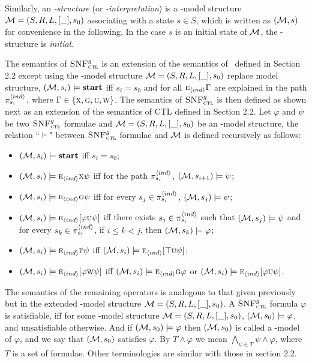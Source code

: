 \documentclass[letterpaper]{article} %
\begin{document}
Similarly, an {\em \Ind-structure} (or {\em \Ind-interpretation}) is a \Ind-model structure
${\cal M}=(S, R, L, [\_], s_0)$ associating
with a state $s\in S$, which is written as $({\cal M},s)$ for convenience in the following.
In the case $s$ is an initial state of $\cal M$, the \Ind-structure is {\em initial}.

The semantics of ${\textsc{SNF}_{\textsc{ctl}}^g}$ is an extension of the semantics of \CTL\ defined in Section 2.2 except using the \Ind-model structure ${\cal M}=(S,R,L,[\_],s_0)$ replace model structure, $({\cal M},s_i) \models \textbf{start}$ iff $s_i=s_0$ and for all $\textsc{e}_{{\langle{ind}\rangle}} \Gamma$ are explained in the path $\pi_{s_i}^{{\langle{ind}\rangle}}$, where $\Gamma\in \{\textsc{x}, \textsc{g}, \textsc{u},\textsc{w}\}$.
The semantics of ${\textsc{SNF}_{\textsc{ctl}}^g}$ is then
defined as shown next as an extension of the semantics of CTL defined in Section 2.2. Let $\varphi$ and $\psi$ be two ${\textsc{SNF}_{\textsc{ctl}}^g}$ formulae and ${\cal M}=(S,R,L,[\_],s_0)$ be an \Ind-model structure, the relation ``$\models$" between ${\textsc{SNF}_{\textsc{ctl}}^g}$ formulae and ${\cal M}$ is defined recursively as follows:
\begin{itemize}
  \item $({\cal M},s_i) \models \textbf{start}$ iff $s_i=s_0$;
  \item $({\cal M},s_i)\models \textsc{e}_{{\langle{ind}\rangle}} \textsc{x} \psi$ iff for the path $\pi_{s_i}^{{\langle{ind}\rangle}}$, $({\cal M}, s_{i+1})\models \psi$;
  \item $({\cal M},s_i)\models \textsc{e}_{{\langle{ind}\rangle}}\textsc{g}\psi$ iff
    for every $s_j \in \pi_{s_i}^{{\langle{ind}\rangle}}$,
    $({\cal M},s_j) \models \psi$;
  \item $({\cal M},s_i)\models \textsc{e}_{{\langle{ind}\rangle}}[\varphi\textsc{u}\psi]$ iff
      there exists $s_j\in \pi_{s_i}^{{\langle{ind}\rangle}}$ such that $({\cal M},s_j) \models \psi$ and for every $s_k \in \pi_{s_i}^{{\langle{ind}\rangle}}$, if $i\leq k < j$, then $({\cal M},s_k) \models \varphi$;
  \item $({\cal M},s_i) \models \textsc{e}_{{\langle{ind}\rangle}} \textsc{f} \psi$ iff $({\cal M},s_i) \models \textsc{e}_{{\langle{ind}\rangle}}[\top \textsc{u}\psi]$;
  \item $({\cal M},s_i)\models \textsc{e}_{{\langle{ind}\rangle}}[\varphi\textsc{w}\psi]$ iff $({\cal M},s_i) \models \textsc{e}_{{\langle{ind}\rangle}}\textsc{g} \varphi$ or $({\cal M},s_i)\models \textsc{e}_{{\langle{ind}\rangle}}[\varphi\textsc{u}\psi]$.
\end{itemize}
The semantics of the remaining operators is analogous to that given previously but in the
extended \Ind-model structure ${\cal M}=(S, R, L, [\_],s_0)$.
A ${\textsc{SNF}_{\textsc{ctl}}^g}$ formula $\varphi$ is satisfiable, iff for some \Ind-model structure ${\cal M}=(S,R,L,[\_],s_0)$, $({\cal M},s_0)\models \varphi$, and unsatisfiable otherwise. And if $({\cal M},s_0)\models \varphi$ then $({\cal M},s_0)$ is called a \Ind-model of $\varphi$, and we say that $({\cal M},s_0)$ satisfies $\varphi$.
By $T \wedge \varphi$ we mean $\bigwedge_{\psi\in T} \psi \wedge \varphi$, where $T$ is a set of formulae.
Other terminologies are similar with those in section 2.2.
\end{document}
